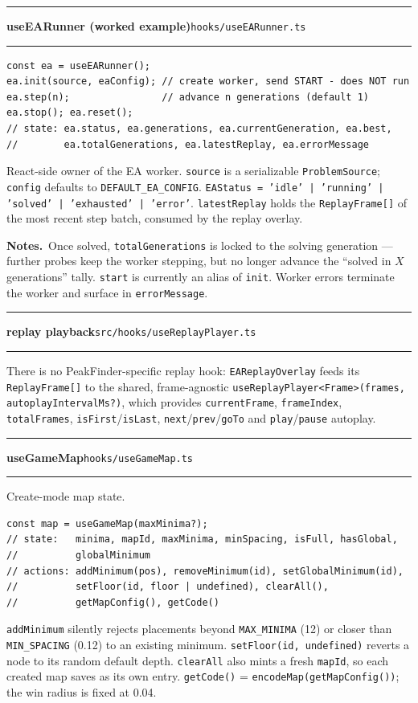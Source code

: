 \documentclass[11pt,a4paper]{report}
\newcommand{\srcfile}[1]{\texttt{\small #1}}   %
\newcommand{\ts}[1]{\texttt{#1}}               %
\newenvironment{apientry}[2]{%
  \par\medskip\noindent
  \begin{minipage}{\textwidth}
  \hrule\vspace{0.6ex}
  {\large\ttfamily\bfseries #1}\hfill{\footnotesize\srcfile{#2}}
  \vspace{0.4ex}\hrule\medskip
}{%
  \end{minipage}\par\medskip
}
\newcommand{\apifield}[1]{\par\smallskip\noindent\textbf{#1.}\ }
\begin{document}
\begin{apientry}{useEARunner (worked example)}{hooks/useEARunner.ts}
\begin{lstlisting}
const ea = useEARunner();
ea.init(source, eaConfig); // create worker, send START - does NOT run
ea.step(n);                // advance n generations (default 1)
ea.stop(); ea.reset();
// state: ea.status, ea.generations, ea.currentGeneration, ea.best,
//        ea.totalGenerations, ea.latestReplay, ea.errorMessage
\end{lstlisting}
React-side owner of the EA worker. \ts{source} is a serializable
\ts{ProblemSource}; \ts{config} defaults to \ts{DEFAULT\_EA\_CONFIG}.
\ts{EAStatus = 'idle' | 'running' | 'solved' | 'exhausted' | 'error'}.
\ts{latestReplay} holds the \ts{ReplayFrame[]} of the most recent step
batch, consumed by the replay overlay.
\apifield{Notes}Once solved, \ts{totalGenerations} is locked to the
solving generation --- further probes keep the worker stepping, but no
longer advance the ``solved in $X$ generations'' tally. \ts{start} is
currently an alias of \ts{init}. Worker errors terminate the worker and
surface in \ts{errorMessage}.
\end{apientry}

\begin{apientry}{replay playback}{src/hooks/useReplayPlayer.ts}
There is no PeakFinder-specific replay hook: \ts{EAReplayOverlay} feeds
its \ts{ReplayFrame[]} to the shared, frame-agnostic
\ts{useReplayPlayer<Frame>(frames, autoplayIntervalMs?)}, which provides
\ts{currentFrame}, \ts{frameIndex}, \ts{totalFrames},
\ts{isFirst}/\ts{isLast}, \ts{next}/\ts{prev}/\ts{goTo} and
\ts{play}/\ts{pause} autoplay.
\end{apientry}

\begin{apientry}{useGameMap}{hooks/useGameMap.ts}
Create-mode map state.
\begin{lstlisting}
const map = useGameMap(maxMinima?);
// state:   minima, mapId, maxMinima, minSpacing, isFull, hasGlobal,
//          globalMinimum
// actions: addMinimum(pos), removeMinimum(id), setGlobalMinimum(id),
//          setFloor(id, floor | undefined), clearAll(),
//          getMapConfig(), getCode()
\end{lstlisting}
\ts{addMinimum} silently rejects placements beyond \ts{MAX\_MINIMA} (12)
or closer than \ts{MIN\_SPACING} (0.12) to an existing minimum.
\ts{setFloor(id, undefined)} reverts a node to its random default depth.
\ts{clearAll} also mints a fresh \ts{mapId}, so each created map saves as
its own entry. \ts{getCode()} = \ts{encodeMap(getMapConfig())}; the win
radius is fixed at 0.04.
\end{apientry}
\end{document}
